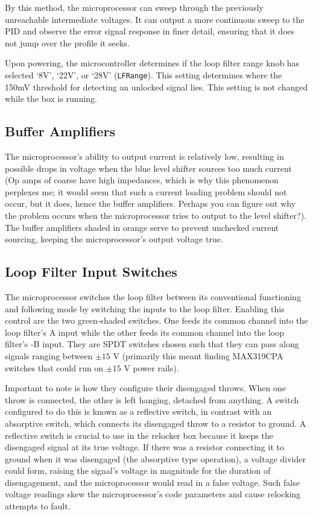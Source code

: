 \documentclass[10pt]{report}
\begin{document}
By this method, the microprocessor can sweep through the previously unreachable intermediate voltages. It can output a more continuous sweep to the PID and observe the error signal response in finer detail, ensuring that it does not jump over the profile it seeks.

Upon powering, the microcontroller determines if the loop filter range knob has selected `8V', `22V', or `28V' (\texttt{LFRange}). This setting determines where the 150mV threshold for detecting an unlocked signal lies. This setting is not changed while the box is running.

\subsection{Buffer Amplifiers}

The microprocessor's ability to output current is relatively low, resulting in possible drops in voltage when the blue level shifter sources too much current (Op amps of coarse have high impedances, which is why this phenomenon perplexes me; it would seem that such a current loading problem should not occur, but it does, hence the buffer amplifiers. Perhaps you can figure out why the problem occurs when the microprocessor tries to output to the level shifter?). The buffer amplifiers shaded in orange serve to prevent unchecked current sourcing, keeping the microprocessor's output voltage true.

\subsection{Loop Filter Input Switches}
\label{subsect:loopFilterInputSwitches}

The microprocessor switches the loop filter between its conventional functioning and following mode by switching the inputs to the loop filter. Enabling this control are the two green-shaded switches. One feeds its common channel into the loop filter's A input while the other feeds its common channel into the loop filter's -B input. They are SPDT switches chosen such that they can pass along signals ranging between $\pm15$ V (primarily this meant finding MAX319CPA switches that could run on $\pm15$ V power rails).

Important to note is how they configure their disengaged throws. When one throw is connected, the other is left hanging, detached from anything. A switch configured to do this is known as a reflective switch, in contrast with an absorptive switch, which connects its disengaged throw to a resistor to ground. A reflective switch is crucial to use in the relocker box because it keeps the disengaged signal at its true voltage. If there was a resistor connecting it to ground when it was disengaged (the absorptive type operation), a voltage divider could form, raising the signal's voltage in magnitude for the duration of disengagement, and the microprocessor would read in a false voltage. Such false voltage readings skew the microprocessor's code parameters and cause relocking attempts to fault.
\end{document}
